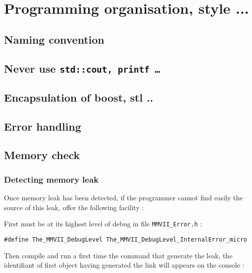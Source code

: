 
\chapter{Programming organisation, style ...}

\section{Naming convention}

\section{Never use {\tt std::cout, printf \dots}}

\section{Encapsulation of boost, stl ..}
\section{Error handling}


\section{Memory check}


\subsection{Detecting memory leak}

Once memory leak has been detected, if the programmer cannot find easily the source of
this leak, \PPP offer the following facility :

First \PPP must be at its highest level of debug in file {\tt MMVII\_Error.h} :

\begin{verbatim}
#define The_MMVII_DebugLevel The_MMVII_DebugLevel_InternalError_micro
\end{verbatim}

Then compile and run a first time  the command that generate the leak, the identifiant of first
object having generated the link will appears on the console :

